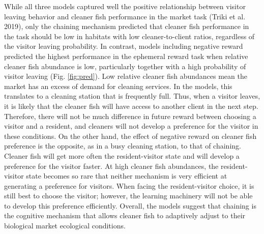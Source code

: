 \documentclass[
  12pt,
]{article}
\begin{document}
While all three models captured well the positive relationship between
visitor leaving behavior and cleaner fish performance in the market task
(Triki et al. 2019), only the chaining mechanism predicted that cleaner
fish performance in the task should be low in habitats with low
cleaner-to-client ratios, regardless of the visitor leaving probability.
In contrast, models including negative reward predicted the highest
performance in the ephemeral reward task when relative cleaner fish
abundance is low, particularly together with a high probability of
visitor leaving (Fig. \ref{fig:pred}). Low relative cleaner fish
abundances mean the market has an excess of demand for cleaning
services. In the models, this translates to a cleaning station that is
frequently full. Thus, when a visitor leaves, it is likely that the
cleaner fish will have access to another client in the next step.
Therefore, there will not be much difference in future reward between
choosing a visitor and a resident, and cleaners will not develop a
preference for the visitor in these conditions. On the other hand, the
effect of negative reward on cleaner fish preference is the opposite, as
in a busy cleaning station, to that of chaining. Cleaner fish will get
more often the resident-visitor state and will develop a preference for
the visitor faster. At high cleaner fish abundances, the
resident-visitor state becomes so rare that neither mechanism is very
efficient at generating a preference for visitors. When facing the
resident-visitor choice, it is still best to choose the visitor;
however, the learning machinery will not be able to develop this
preference efficiently. Overall, the models suggest that chaining is the
cognitive mechanism that allows cleaner fish to adaptively adjust to
their biological market ecological conditions.
\end{document}
